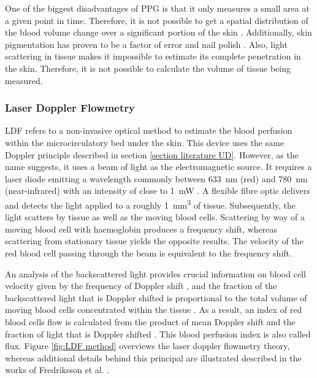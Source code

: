 One of the biggest disadvantages of PPG is that it only measures a small area at a given point in time. Therefore, it is not possible to get a spatial distribution of the blood volume change over a significant portion of the skin \cite{wu2003ppgi}. Additionally, skin pigmentation has proven to be a factor of error and nail polish \cite{fallow2013influence}. Also, light scattering in tissue makes it impossible to estimate its complete penetration in the skin. Therefore, it is not possible to calculate the volume of tissue being measured.


\subsubsection{Laser Doppler Flowmetry}
\label{section literature LDF}
LDF refers to a non-invasive optical method to estimate the blood perfusion within the microcirculatory bed under the skin. This device uses the same Doppler principle described in section \ref{section literature UD}. However, as the name suggests, it uses a beam of light as the electromagnetic source. It requires a laser diode emitting a wavelength commonly between \SI{633}{\nano\metre} (red) and \SI{780}{\nano\metre} (near-infrared) with an intensity of close to \SI{1}{\milli\watt} \cite{fredriksson2007laser}. A flexible fibre optic delivers and detects the light applied to a roughly \SI{1}{\cubic\mm} of tissue. Subsequently, the light scatters by tissue as well as the moving blood cells. Scattering by way of a moving blood cell with haemoglobin produces a frequency shift, whereas scattering from stationary tissue yields the opposite results. The velocity of the red blood cell passing through the beam is equivalent to the frequency shift. 

An analysis of the backscattered light provides crucial information on blood cell velocity given by the frequency of Doppler shift \cite{fredriksson2007laser,dirnagl1989continuous}, and the fraction of the backscattered light that is Doppler shifted is proportional to the total volume of moving blood cells concentrated within the tissue \cite{dirnagl1989continuous}. As a result, an index of red blood cells flow is calculated from the product of mean Doppler shift and the fraction of light that is Doppler shifted \cite{dirnagl1989continuous}. This blood perfusion index is also called flux. Figure \ref{fig:LDF method} overviews the laser doppler flowmetry theory, whereas additional details behind this principal are illustrated described in the works of Fredriksson et al. \cite{fredriksson2007laser}.  

